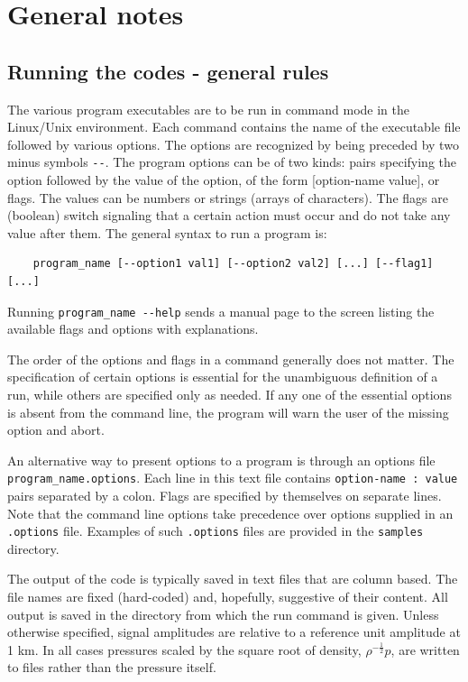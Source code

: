 
\section{General notes}

\subsection{Running the codes - general rules}
The various program executables are to be run in command mode in the Linux/Unix environment. Each command contains the name of the executable file followed by various options. The options are recognized by being preceded by two minus symbols \verb"--". The program options can be of two kinds: pairs specifying the option followed by the value of the option, of the form [option-name  value], or flags. The values can be numbers or strings (arrays of characters). The flags are (boolean) switch signaling that a certain action must occur and do not take any value after them. The general syntax to run a program is:
\begin{verbatim} 
    program_name [--option1 val1] [--option2 val2] [...] [--flag1] [...] 
\end{verbatim}
Running \verb"program_name --help" sends a manual page to the screen listing the available flags and options with explanations. 

The order of the options and flags in a command generally does not matter. The specification of certain options is essential for the unambiguous definition of a run, while others are specified only as needed. If any one of the essential options is absent from the command line, the program will warn the user of the missing option and abort.  

An alternative way to present options to a program is through an options file \verb"program_name.options".  Each line in this text file contains \verb"option-name : value" pairs separated by a colon. Flags are specified by themselves on separate lines. Note that the command line options take precedence over options supplied  in an \verb".options" file. Examples of such \verb".options" files are provided in the \verb"samples" directory.

The output of the code is typically saved in text files that are column based. The file names are fixed (hard-coded) and, hopefully, suggestive of their content. All output is saved in the directory from which the run command is given. Unless otherwise specified, signal amplitudes are relative to a reference unit amplitude at 1 km. In all cases pressures scaled by the square root of density, $\rho^{-\frac{1}{2}}p$, are written to files rather than the pressure itself. 


